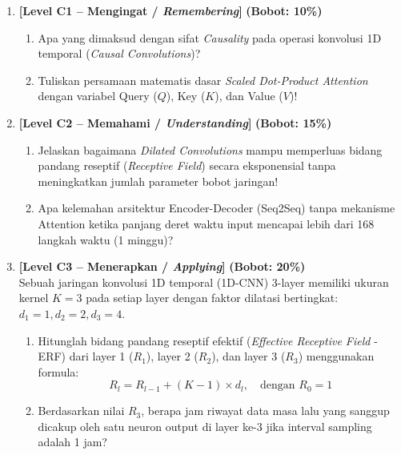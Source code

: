 \documentclass[11pt,a4paper]{article}
\begin{document}
\begin{enumerate}[leftmargin=1.5em, label=\textbf{Soal \arabic*.}]

    \item \textbf{[Level C1 -- Mengingat / \textit{Remembering}]} \hfill \textbf{(Bobot: 10\%)}
    \begin{enumerate}[label=\alph*.]
        \item Apa yang dimaksud dengan sifat \textit{Causality} pada operasi konvolusi 1D temporal (\textit{Causal Convolutions})?
        \item Tuliskan persamaan matematis dasar \textit{Scaled Dot-Product Attention} dengan variabel Query ($Q$), Key ($K$), dan Value ($V$)!
    \end{enumerate}

    \vspace{0.3cm}

    \item \textbf{[Level C2 -- Memahami / \textit{Understanding}]} \hfill \textbf{(Bobot: 15\%)}
    \begin{enumerate}[label=\alph*.]
        \item Jelaskan bagaimana \textit{Dilated Convolutions} mampu memperluas bidang pandang reseptif (\textit{Receptive Field}) secara eksponensial tanpa meningkatkan jumlah parameter bobot jaringan!
        \item Apa kelemahan arsitektur Encoder-Decoder (Seq2Seq) tanpa mekanisme Attention ketika panjang deret waktu input mencapai lebih dari 168 langkah waktu (1 minggu)?
    \end{enumerate}

    \vspace{0.3cm}

    \item \textbf{[Level C3 -- Menerapkan / \textit{Applying}]} \hfill \textbf{(Bobot: 20\%)} \\
    Sebuah jaringan konvolusi 1D temporal (1D-CNN) 3-layer memiliki ukuran kernel $K = 3$ pada setiap layer dengan faktor dilatasi bertingkat: $d_1 = 1, d_2 = 2, d_3 = 4$.
    \begin{enumerate}[label=\alph*.]
        \item Hitunglah bidang pandang reseptif efektif (\textit{Effective Receptive Field} - ERF) dari layer 1 ($R_1$), layer 2 ($R_2$), dan layer 3 ($R_3$) menggunakan formula:
        \begin{equation*}
            R_l = R_{l-1} + (K - 1) \times d_l, \quad \text{dengan } R_0 = 1
        \end{equation*}
        \item Berdasarkan nilai $R_3$, berapa jam riwayat data masa lalu yang sanggup dicakup oleh satu neuron output di layer ke-3 jika interval sampling adalah 1 jam?
    \end{enumerate}


\end{enumerate}
\end{document}
